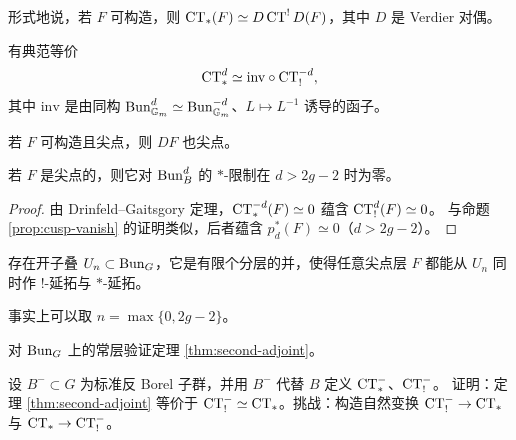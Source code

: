 \begin{remark}\label{rem:ct-duality}
形式地说，若 \(F\) 可构造，则 \(\operatorname{CT}_*(F)\simeq D\operatorname{CT}^!D(F)\)，其中 \(D\) 是 Verdier 对偶。
\end{remark}

\begin{theorem}\label{thm:second-adjoint}
有典范等价
\[
\operatorname{CT}^d_*\simeq\mathrm{inv}\circ\operatorname{CT}^{-d}_!,
\]
其中 \(\mathrm{inv}\) 是由同构 \(\operatorname{Bun}^d_{\mathbb{G}_m}\simeq\operatorname{Bun}^{-d}_{\mathbb{G}_m}\)、\(L\mapsto L^{-1}\) 诱导的函子。
\end{theorem}

\begin{corollary}\label{cor:dual-cusp}
若 \(F\) 可构造且尖点，则 \(DF\) 也尖点。
\end{corollary}

\begin{corollary}\label{cor:star-vanish}
若 \(F\) 是尖点的，则它对 \(\operatorname{Bun}^d_B\) 的 \(*\)-限制在 \(d>2g-2\) 时为零。
\end{corollary}

\begin{proof}
由 Drinfeld--Gaitsgory 定理，\(\operatorname{CT}^{-d}_*(F)\simeq 0\) 蕴含 \(\operatorname{CT}^d_!(F)\simeq 0\)。
与命题 \ref{prop:cusp-vanish} 的证明类似，后者蕴含 \(p^*_d(F)\simeq 0\)（\(d>2g-2\)）。
\end{proof}

\begin{corollary}\label{cor:extend}
存在开子叠 \(U_n\subset\operatorname{Bun}_G\)，它是有限个分层的并，使得任意尖点层 \(F\) 都能从 \(U_n\)
同时作 \(!\)-延拓与 \(*\)-延拓。
\end{corollary}

\begin{remark}\label{rem:n}
事实上可以取 \(n=\max\{0,2g-2\}\)。
\end{remark}

\begin{exercise}\label{ex:second-adjoint-constant}
对 \(\operatorname{Bun}_G\) 上的常层验证定理 \ref{thm:second-adjoint}。
\end{exercise}

\begin{exercise}\label{ex:opposite-borel}
设 \(B^-\subset G\) 为标准反 Borel 子群，并用 \(B^-\) 代替 \(B\) 定义 \(\operatorname{CT}^-_*\)、\(\operatorname{CT}^-_!\)。
证明：定理 \ref{thm:second-adjoint} 等价于 \(\operatorname{CT}^-_!\simeq\operatorname{CT}_*\)。挑战：构造自然变换
\(\operatorname{CT}^-_!\to\operatorname{CT}_*\) 与 \(\operatorname{CT}_*\to\operatorname{CT}^-_!\)。
\end{exercise}

